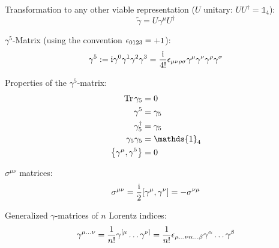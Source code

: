			\noindent
			Transformation to any other viable representation ($U$ unitary: $U U^\dagger=\mathds{1}_4$):
			\begin{equation}
				\tilde{\gamma} = U \gamma^\mu U^\dagger
			\end{equation}

			\noindent
			$\gamma^5$-Matrix (using the convention $\epsilon_{0123} = +1$):
			\begin{equation}
				\gamma^5 := \mathrm{i}\gamma^0 \gamma^1 \gamma^2 \gamma^3
				= \frac{\mathrm{i}}{4!}\epsilon_{\mu\nu\rho\sigma} \gamma^\mu \gamma^\nu \gamma^\rho \gamma^\sigma
			\end{equation}

			\noindent
			Properties of the $\gamma^5$-matrix:
			\begin{align}
				\tr \gamma_5 &= 0 \\
				\gamma^5 &= \gamma_5 \\
				\gamma_5^\dagger &= \gamma_5 \\
				\gamma_5 \gamma_5 &= \mathds{1}_4 \\
				\acomm{\gamma^\mu}{\gamma^5} &= 0
			\end{align}

			\noindent
			$\sigma^{\mu\nu}$ matrices:
			\begin{equation}
				\sigma^{\mu\nu} = \frac{\i}{2}\comm{\gamma^\mu}{\gamma^\nu} = -\sigma^{\nu\mu}
			\end{equation}

			\noindent
			Generalized $\gamma$-matrices of $n$ Lorentz indices:
			\begin{equation}
				\gamma^{\mu\dots\nu} = \frac{1}{n!} \gamma^{[\mu} \dots \gamma^{\nu]}
				= \frac{1}{n!}\epsilon_{\mu\dots\nu\alpha\dots\beta} \gamma^\alpha \dots \gamma^\beta
			\end{equation}

